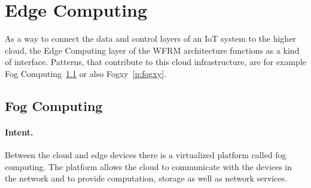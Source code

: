 \section{Edge Computing}\label{L3}
As a way to connect the data and control layers of an IoT system to the higher cloud, the Edge Computing layer of the WFRM architecture functions as a kind of interface. Patterns, that contribute to this cloud infrastructure, are for example Fog Computing~\ref{p:fog} or also Fogxy~\ref{p:fogxy}.


\subsection{Fog Computing~\cite{Syed2016}} 
\label{p:fog}

\paragraph{\textbf{Intent.}} Between the cloud and edge devices there is a virtualized platform called fog computing. The platform allows the cloud to communicate with the devices in the network and to provide computation, storage as well as network services.

